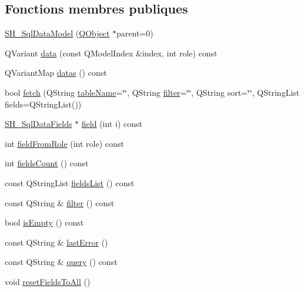 \subsection*{Fonctions membres publiques}
\begin{DoxyCompactItemize}
\item 
\hyperlink{classSH__SqlDataModel_a946716dc9b74e3ec4a70778319ceb3f8}{S\-H\-\_\-\-Sql\-Data\-Model} (\hyperlink{classQObject}{Q\-Object} $\ast$parent=0)
\item 
Q\-Variant \hyperlink{classSH__SqlDataModel_a30cc763618d73a1bb5410c84812c0b9f}{data} (const Q\-Model\-Index \&index, int role) const 
\item 
Q\-Variant\-Map \hyperlink{classSH__SqlDataModel_a6d91d42cfaf86d1fbbaeeb7a32efc26b}{datas} () const 
\item 
bool \hyperlink{classSH__SqlDataModel_a8d9b08d282a304945b9ee2f474020980}{fetch} (Q\-String \hyperlink{classSH__SqlDataModel_a2497b87a0e4864f3d3e2f10f16ca19f1}{table\-Name}=\char`\"{}\char`\"{}, Q\-String \hyperlink{classSH__SqlDataModel_a52d2212d201cd31ad0ebfebc1664c3ad}{filter}=\char`\"{}\char`\"{}, Q\-String sort=\char`\"{}\char`\"{}, Q\-String\-List fields=Q\-String\-List())
\item 
\hyperlink{classSH__SqlDataFields}{S\-H\-\_\-\-Sql\-Data\-Fields} $\ast$ \hyperlink{classSH__SqlDataModel_a442cdea9007cb61ed9d2fbdd01ddccbf}{field} (int i) const 
\item 
int \hyperlink{classSH__SqlDataModel_a0883eb1a7bc16b44a0f404e53f6df104}{field\-From\-Role} (int role) const 
\item 
int \hyperlink{classSH__SqlDataModel_a0fd7bd5380ce0ba9a2ca84033093432d}{fields\-Count} () const 
\item 
const Q\-String\-List \hyperlink{classSH__SqlDataModel_aaca5b8197cf2e6a10cdda5e19522ffec}{fields\-List} () const 
\item 
const Q\-String \& \hyperlink{classSH__SqlDataModel_aa86018df823c85798574ec8d63413c1a}{filter} () const 
\item 
bool \hyperlink{classSH__SqlDataModel_a9bc7c550e40c23632445678b87fd4b48}{is\-Empty} () const 
\item 
const Q\-String \& \hyperlink{classSH__SqlDataModel_ade915650ffbdb8d026e00893d1f5a195}{last\-Error} ()
\item 
const Q\-String \& \hyperlink{classSH__SqlDataModel_acca7800c1da13145fd5386f287c15da3}{query} () const 
\item 
void \hyperlink{classSH__SqlDataModel_a2ce01d331acbef46e8ae9d5963f3521d}{reset\-Fields\-To\-All} ()

\end{DoxyCompactItemize}
